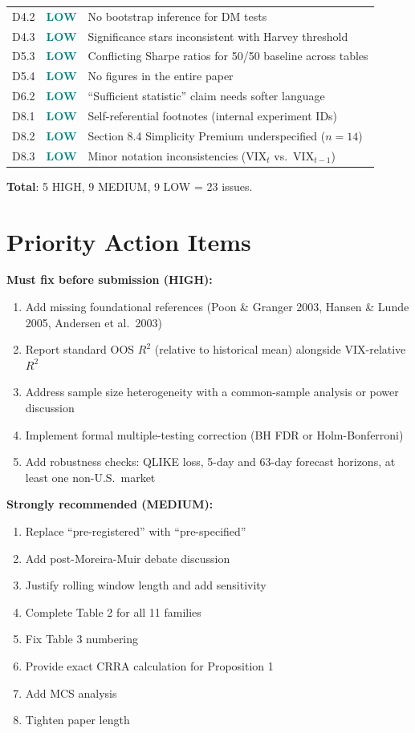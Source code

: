 \documentclass[12pt,a4paper]{article}
\newcommand{\LOW}{\textcolor{teal}{\textbf{LOW}}}
\begin{document}
\begin{longtable}{@{}p{1cm}p{2cm}p{10cm}@{}}
D4.2 & \LOW & No bootstrap inference for DM tests \\
D4.3 & \LOW & Significance stars inconsistent with Harvey threshold \\
D5.3 & \LOW & Conflicting Sharpe ratios for 50/50 baseline across tables \\
D5.4 & \LOW & No figures in the entire paper \\
D6.2 & \LOW & ``Sufficient statistic'' claim needs softer language \\
D8.1 & \LOW & Self-referential footnotes (internal experiment IDs) \\
D8.2 & \LOW & Section 8.4 Simplicity Premium underspecified ($n=14$) \\
D8.3 & \LOW & Minor notation inconsistencies ($\text{VIX}_t$ vs.\ $\text{VIX}_{t-1}$) \\
\end{longtable}

\noindent\textbf{Total}: 5 HIGH, 9 MEDIUM, 9 LOW = 23 issues.


\section{Priority Action Items}
\label{sec:actions}

\noindent\textbf{Must fix before submission (HIGH):}
\begin{enumerate}
    \item Add missing foundational references (Poon \& Granger 2003, Hansen \& Lunde 2005, Andersen et al.\ 2003)
    \item Report standard OOS $R^2$ (relative to historical mean) alongside VIX-relative $R^2$
    \item Address sample size heterogeneity with a common-sample analysis or power discussion
    \item Implement formal multiple-testing correction (BH FDR or Holm-Bonferroni)
    \item Add robustness checks: QLIKE loss, 5-day and 63-day forecast horizons, at least one non-U.S.\ market
\end{enumerate}

\noindent\textbf{Strongly recommended (MEDIUM):}
\begin{enumerate}[resume]
    \item Replace ``pre-registered'' with ``pre-specified''
    \item Add post-Moreira-Muir debate discussion
    \item Justify rolling window length and add sensitivity
    \item Complete Table 2 for all 11 families
    \item Fix Table 3 numbering
    \item Provide exact CRRA calculation for Proposition 1
    \item Add MCS analysis
    \item Tighten paper length
\end{enumerate}
\end{document}
